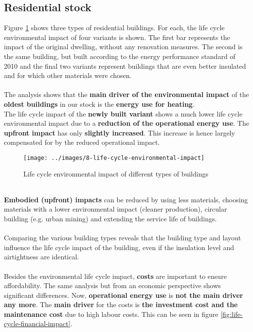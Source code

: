 \documentclass[../summary.tex]{subfiles}
\begin{document}
\subsection{Residential stock}

Figure \ref{fig:life-cycle-environmental-impact} shows three types of residential buildings. For each, the life cycle environmental impact of four variants is shown. The first bar represents the impact of the original dwelling, without any renovation measures. The second is the same building, but built according to the energy performance standard of 2010 and the final two variants represent buildings that are even better insulated and for which other materials were chosen.
\\\\
The analysis shows that the \textbf{main driver of the environmental impact} of the \textbf{oldest buildings} in our stock is the \textbf{energy use for heating}.
\\
The life cycle impact of the \textbf{newly built variant} shows a much lower life cycle environmental impact due to a \textbf{reduction of the operational energy use}. The \textbf{upfront impact} has only \textbf{slightly increased}. This increase is hence largely compensated for by the reduced operational impact.

\begin{figure}[H]
	\centering
	\texttt{[image: ../images/8-life-cycle-environmental-impact]}
	\caption{Life cycle environmental impact of different types of buildings}
	\label{fig:life-cycle-environmental-impact}
\end{figure}
\ \\
\textbf{Embodied (upfront) impacts} can be reduced by using less materials, choosing materials with a lower environmental impact (cleaner production), circular building (e.g. urban mining) and extending the service life of buildings.
\\\\
Comparing the various building types reveals that the building type and layout influence the life cycle impact of the building, even if the insulation level and airtightness are identical.
\\\\
Besides the environmental life cycle impact, \textbf{costs} are important to ensure affordability. The same analysis but from an economic perspective shows significant differences. Now, \textbf{operational energy use} is \textbf{not the main driver any more}.
The \textbf{main driver} for the costs is \textbf{the investment cost and the maintenance cost} due to high labour costs. This can be seen in figure \ref{fig:life-cycle-financial-impact}.
\end{document}
